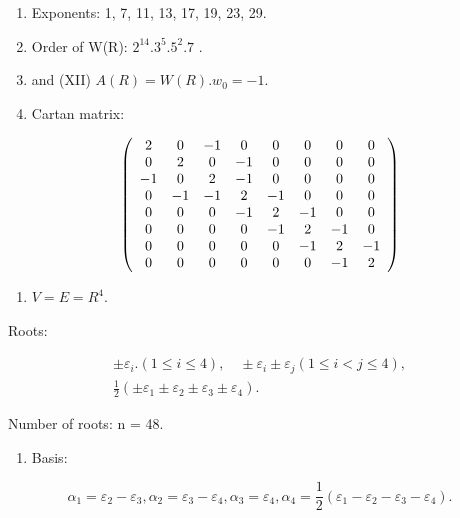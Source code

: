 \begin{enumerate}
\def\labelenumi{(\Roman{enumi})}
\setcounter{enumi}{8}
\item
  Exponents: 1, 7, 11, 13, 17, 19, 23, 29.
\item
  Order of W(R): \(2^{14}.3^{5}.5^{2}.7\) .
\item
  and (XII) \(A(R) = W(R). w_0 = -1.\)
\item
  Cartan matrix:
\end{enumerate}

\[
\left( \begin{array}{c c c c c c c c} 2 & 0 & - 1 & 0 & 0 & 0 & 0 & 0 \\ 0 & 2 & 0 & - 1 & 0 & 0 & 0 & 0 \\ - 1 & 0 & 2 & - 1 & 0 & 0 & 0 & 0 \\ 0 & - 1 & - 1 & 2 & - 1 & 0 & 0 & 0 \\ 0 & 0 & 0 & - 1 & 2 & - 1 & 0 & 0 \\ 0 & 0 & 0 & 0 & - 1 & 2 & - 1 & 0 \\ 0 & 0 & 0 & 0 & 0 & - 1 & 2 & - 1 \\ 0 & 0 & 0 & 0 & 0 & 0 & - 1 & 2 \end{array} \right)
\]


\begin{enumerate}
\def\labelenumi{(\Roman{enumi})}
\tightlist
\item
  \(V = E = R^4.\)
\end{enumerate}

Roots:

\[
\begin{array}{c} \pm \varepsilon_ {i}. (1 \leqslant i \leqslant 4), \quad \pm \varepsilon_ {i} \pm \varepsilon_ {j} (1 \leqslant i <   j \leqslant 4), \\ \frac {1}{2} (\pm \varepsilon_ {1} \pm \varepsilon_ {2} \pm \varepsilon_ {3} \pm \varepsilon_ {4}). \end{array}
\]

Number of roots: n = 48.

\begin{enumerate}
\def\labelenumi{(\Roman{enumi})}
\setcounter{enumi}{1}
\tightlist
\item
  Basis:
\end{enumerate}

\[
\alpha_ {1} = \varepsilon_ {2} - \varepsilon_ {3}, \alpha_ {2} = \varepsilon_ {3} - \varepsilon_ {4}, \alpha_ {3} = \varepsilon_ {4}, \alpha_ {4} = \frac {1}{2} (\varepsilon_ {1} - \varepsilon_ {2} - \varepsilon_ {3} - \varepsilon_ {4}).
\]

